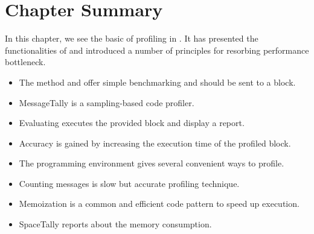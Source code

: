 \documentclass[a4paper,10pt,twoside]{book}
\begin{document}
\section{Chapter Summary}
In this chapter, we see the basic of profiling in \pharo. It has presented the functionalities of  and introduced a number of principles for resorbing performance bottleneck. 
\begin{itemize}
\item The method  and  offer simple benchmarking and should be sent to a block.

\item MessageTally is a sampling-based code profiler.
\item Evaluating  executes the provided block and display a report.
\item Accuracy is gained by increasing the execution time of the profiled block.
\item The \pharo programming environment gives several convenient ways to profile.
\item Counting messages is slow but accurate profiling technique.
\item Memoization is a common and efficient code pattern to speed up execution.
\item SpaceTally reports about the memory consumption.
\end{itemize}





\ifx\wholebook\relax\else
\end{document}
